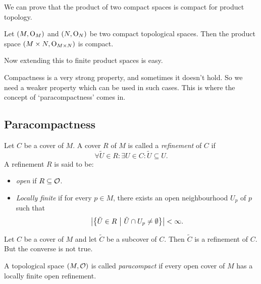 \noindent We can prove that the product of two compact spaces is compact for product topology.
\begin{theorem}
	Let \((M, \mathrm{O}_M)\) and \((N, \mathrm{O}_N)\) be two compact topological spaces. Then the product space \((M \times N, \mathrm{O}_{M \times N})\) is compact.
\end{theorem}
Now extending this to finite product spaces is easy.

Compactness is a very strong property, and sometimes it doesn't hold. So we need a weaker property which can be used in such cases. This is where the concept of `paracompactness' comes in.

\subsection{Paracompactness}

\begin{definition}\label{def:refinement_cover}
	Let \(C\) be a cover of \(M\). A cover \(R\) of \(M\) is called a \emph{refinement} of \(C\) if
	\begin{equation}
		\forall \tilde{U} \in R: \exists U \in C: \tilde{U} \subseteq U. \label{eq:refinement_cover}
	\end{equation}
	A refinement \(R\) is said to be:
	\begin{itemize}
		\item \emph{open} if \(R \subseteq \mathcal{O}\).
		\item \emph{Locally finite} if for every \(p \in M\), there exists an open neighbourhood \(U_p\) of \(p\) such that
		      \begin{equation}
			      \abs{\qty{\tilde{U} \in R \ \middle|\ \tilde{U} \cap U_p \neq \emptyset}} < \infty. \label{eq:locally_finite_cover}
		      \end{equation}
	\end{itemize}
\end{definition}

\begin{remark}
	Let \(C\) be a cover of \(M\) and let \(\tilde{C}\) be a subcover of \(C\). Then \(\tilde{C}\) is a refinement of \(C\). But the converse is not true.
\end{remark}

\begin{definition}\label{def:paracompact_space}
	A topological space \((M, \mathcal{O})\) is called \emph{paracompact} if every open cover of \(M\) has a locally finite open refinement.
\end{definition}

